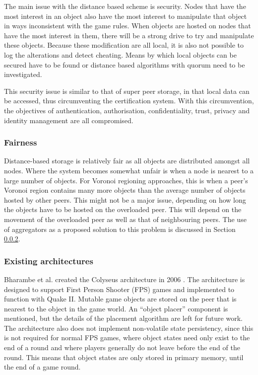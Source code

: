 \documentclass[10pt,a4paper,journal,cspaper,compsoc]{IEEEtran}
\begin{document}
The main issue with the distance based scheme is security. Nodes that have the most interest in an object also have the most interest to manipulate
that object in ways inconsistent with the game rules. When objects are hosted on nodes that have the most interest in them, there will be a strong
drive to try and manipulate these objects. Because these modification are all local, it is also not possible to log the alterations and detect
cheating. Means by which local objects can be secured have to be found or distance based algorithms with quorum need to be investigated.

This security issue is similar to that of super peer storage, in that local data can be accessed, thus circumventing the certification system. With
this circumvention, the objectives of authentication, authorisation, confidentiality, trust, privacy and identity management are all compromised.

\subsubsection{Fairness}

Distance-based storage is relatively fair as all objects are distributed amongst all nodes. Where the system becomes somewhat unfair is when a node
is nearest to a large number of objects. For Voronoi regioning approaches, this is when a peer's Voronoi region contains many more objects than the
average number of objects hosted by other peers. This might not be a major issue, depending on how long the objects have to be hosted on the
overloaded peer. This will depend on the movement of the overloaded peer as well as that of neighbouring peers. The use of aggregators as a proposed
solution to this problem is discussed in Section \ref{distance_based_existing_archs}.

\subsubsection{Existing architectures}
\label{distance_based_existing_archs}

Bharambe et al. created the Colyseus architecture in 2006 \cite{colyseus_distance_based}. The architecture is designed to support First Person
Shooter (FPS) games and implemented to function with Quake II. Mutable game objects are stored on the peer that is nearest to the object in the game
world. An ``object placer'' component is mentioned, but the details of the placement algorithm are left for future work. The architecture also does
not implement non-volatile state persistency, since this is not required for normal FPS games, where object states need only exist to the end of a
round and where players generally do not leave before the end of the round. This means that object states are only stored in primary memory, until
the end of a game round.
\end{document}
